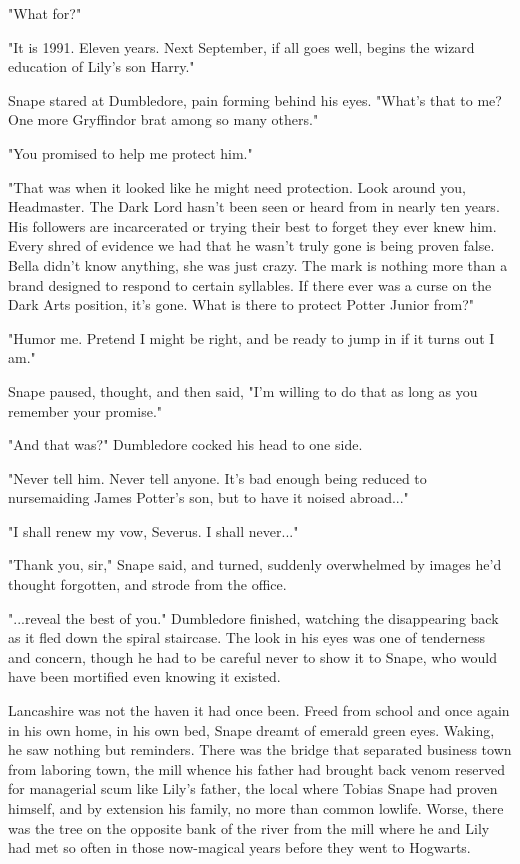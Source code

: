 \documentclass[a4paper,11pt]{article}
\begin{document}
"What for?"

"It is 1991. Eleven years. Next September, if all goes well, begins the wizard education of Lily's son Harry."

Snape stared at Dumbledore, pain forming behind his eyes. "What's that to me? One more Gryffindor brat among so many others."

"You promised to help me protect him."

"That was when it looked like he might need protection. Look around you, Headmaster. The Dark Lord hasn't been seen or heard from in nearly ten years. His followers are incarcerated or trying their best to forget they ever knew him. Every shred of evidence we had that he wasn't truly gone is being proven false. Bella didn't know anything, she was just crazy. The mark is nothing more than a brand designed to respond to certain syllables. If there ever was a curse on the Dark Arts position, it's gone. What is there to protect Potter Junior from?"

"Humor me. Pretend I might be right, and be ready to jump in if it turns out I am."

Snape paused, thought, and then said, "I'm willing to do that as long as you remember your promise."

"And that was?" Dumbledore cocked his head to one side.

"Never tell him. Never tell anyone. It's bad enough being reduced to nursemaiding James Potter's son, but to have it noised abroad..."

"I shall renew my vow, Severus. I shall never..."

"Thank you, sir," Snape said, and turned, suddenly overwhelmed by images he'd thought forgotten, and strode from the office.

"...reveal the best of you." Dumbledore finished, watching the disappearing back as it fled down the spiral staircase. The look in his eyes was one of tenderness and concern, though he had to be careful never to show it to Snape, who would have been mortified even knowing it existed.

Lancashire was not the haven it had once been. Freed from school and once again in his own home, in his own bed, Snape dreamt of emerald green eyes. Waking, he saw nothing but reminders. There was the bridge that separated business town from laboring town, the mill whence his father had brought back venom reserved for managerial scum like Lily's father, the local where Tobias Snape had proven himself, and by extension his family, no more than common lowlife. Worse, there was the tree on the opposite bank of the river from the mill where he and Lily had met so often in those now-magical years before they went to Hogwarts.
\end{document}
